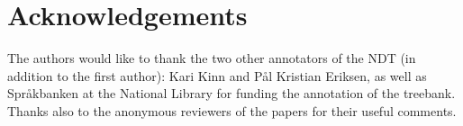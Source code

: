 \documentclass[10pt,a4paper]{article}
\begin{document}
\section{Acknowledgements}

The authors would like to thank the two other annotators of the NDT (in addition to the first author): Kari Kinn and Pål Kristian Eriksen, as well as Spr{\aa}kbanken at the National Library for funding the annotation of the treebank. Thanks also to the anonymous reviewers of the papers for their useful comments.





\end{document}
